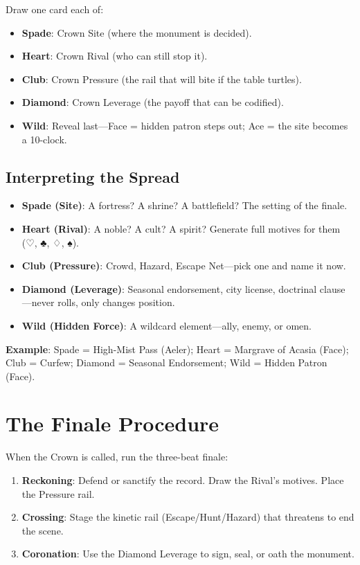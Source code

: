 Draw one card each of:

\begin{itemize}
    \item \textbf{Spade}: Crown Site (where the monument is decided).
    \item \textbf{Heart}: Crown Rival (who can still stop it).
    \item \textbf{Club}: Crown Pressure (the rail that will bite if the table turtles).
    \item \textbf{Diamond}: Crown Leverage (the payoff that can be codified).
    \item \textbf{Wild}: Reveal last—Face = hidden patron steps out; Ace = the site becomes a 10-clock.
\end{itemize}

\subsection*{Interpreting the Spread}

\begin{itemize}
    \item \textbf{Spade (Site)}: A fortress? A shrine? A battlefield? The setting of the finale.
    \item \textbf{Heart (Rival)}: A noble? A cult? A spirit? Generate full motives for them (♡, ♣, ♢, ♠).
    \item \textbf{Club (Pressure)}: Crowd, Hazard, Escape Net—pick one and name it now.
    \item \textbf{Diamond (Leverage)}: Seasonal endorsement, city license, doctrinal clause—never rolls, only changes position.
    \item \textbf{Wild (Hidden Force)}: A wildcard element—ally, enemy, or omen.
\end{itemize}

\textbf{Example}: Spade = High-Mist Pass (Aeler); Heart = Margrave of Acasia (Face); Club = Curfew; Diamond = Seasonal Endorsement; Wild = Hidden Patron (Face).

\section*{The Finale Procedure}

When the Crown is called, run the three-beat finale:

\begin{enumerate}
    \item \textbf{Reckoning}: Defend or sanctify the record. Draw the Rival's motives. Place the Pressure rail.
    \item \textbf{Crossing}: Stage the kinetic rail (Escape/Hunt/Hazard) that threatens to end the scene.
    \item \textbf{Coronation}: Use the Diamond Leverage to sign, seal, or oath the monument.
\end{enumerate}

